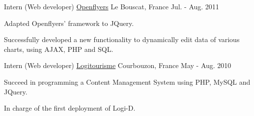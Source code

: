 \begin{cventries}
		\cventry
			{Intern (Web developer)}
			{\href{https://openflyers.com/}{Openflyers}}
			{Le Bouscat, France}
			{Jul. - Aug. 2011}
			{
				\begin{cvitems}
					\item Adapted Openflyers' framework to JQuery.
					\item Successfully developed a new functionality to dynamically edit data of various charts, using AJAX, PHP and SQL.
				\end{cvitems}
			}
		
		\cventry
			{Intern (Web developer)}
			{\href{https://www.logitourisme.com/}{Logitourisme}}
			{Courbouzon, France}
			{May - Aug. 2010}
			{
				\begin{cvitems}
					\item Succeed in programming a Content Management System using PHP, MySQL and JQuery.
					\item In charge of the first deployment of Logi-D.
				\end{cvitems}
			}
	
	\end{cventries}
	